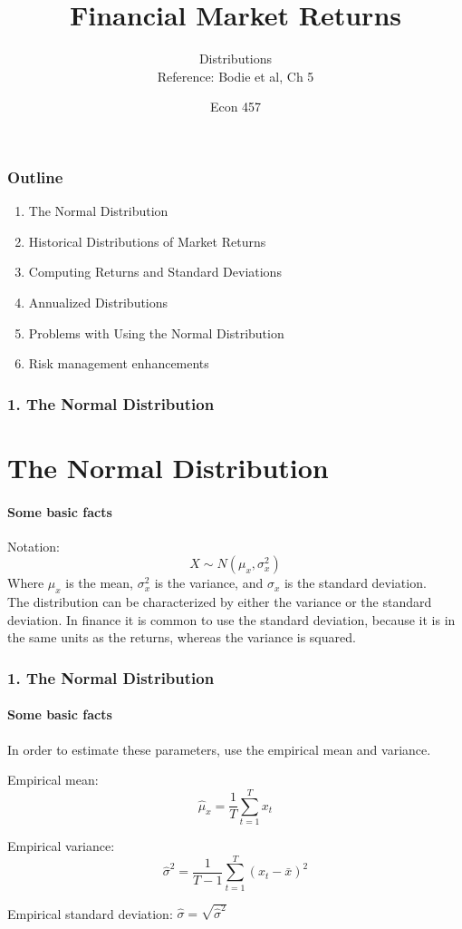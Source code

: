 \documentclass{beamer}
\title{Financial Market Returns}
\subtitle{Distributions \\ Reference: Bodie et al, Ch 5}
\author{Econ 457}
\date{\week}
\begin{document}
\frame{\titlepage}

\begin{frame}
    \frametitle{Outline}

    \begin{enumerate}
        \item The Normal Distribution
        \item Historical Distributions of Market Returns
        \item Computing Returns and Standard Deviations
        \item Annualized Distributions
        \item Problems with Using the Normal Distribution
        \item Risk management enhancements
    \end{enumerate}
\end{frame}

\begin{foundframe}[t]
    \frametitle{1. The Normal Distribution}
    \section{The Normal Distribution}
    \framesubtitle{Some basic facts}

    Notation: 
    $$X \sim N(\mu_x, \sigma_x^2)$$
    Where $\mu_x$ is the mean, $\sigma_x^2$ is the variance, and $\sigma_x$ is the standard deviation.\\   
    \vspace{1em}
    The distribution can be characterized by either the variance or the standard deviation.  
    In finance it is common to use the standard deviation, because it is in the same units as the returns, whereas the variance is squared.\\

\end{foundframe}

\begin{foundframe}[t]
    \frametitle{1. The Normal Distribution}
    \framesubtitle{Some basic facts}

    \vspace{-1em}
    In order to estimate these parameters, use the empirical mean and variance.\\
    \vspace{1em}

    Empirical mean:
    $$\hat{\mu}_x = \frac{1}{T}\sum_{t=1}^{T}x_t$$

    Empirical variance:
    $$\hat{\sigma}^2 = \frac{1}{T-1}\sum_{t=1}^{T}(x_t - \bar{x})^2$$

    Empirical standard deviation:  $\hat{\sigma} = \sqrt{\hat{\sigma}^2}$



\end{foundframe}
\end{document}
